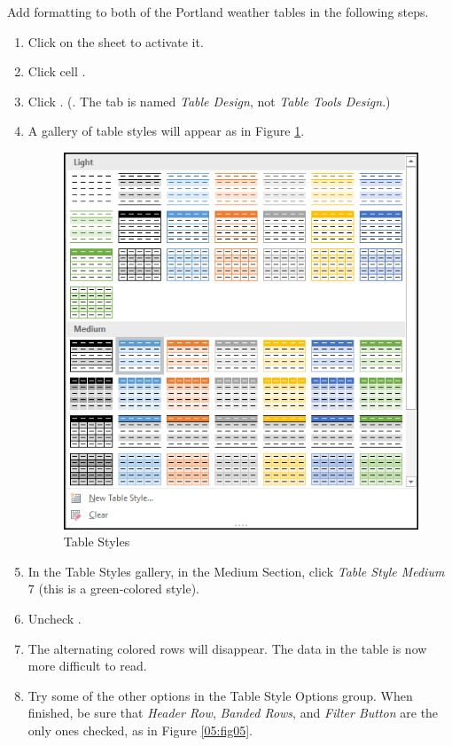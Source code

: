 Add formatting to both of the Portland weather tables in the following steps.

\begin{enumbox}
	\begin{enumerate}
		\item Click on the  sheet to activate it.
		\item Click cell .
		\item Click . (. The tab is named \textit{Table Design}, not \textit{Table Tools Design}.)
		\item A gallery of table styles will appear as in Figure \ref{05:fig04}.

		\begin{figure}[H]
			\centering
			\includegraphics[width=\maxwidth{.75\linewidth}]{gfx/ch05_fig04}
			\caption{Table Styles}
			\label{05:fig04}
		\end{figure}

		\item In the Table Styles gallery, in the Medium Section, click \textit{Table Style Medium} $ 7 $ (this is a green-colored style).
		\item Uncheck .
		\item The alternating colored rows will disappear. The data in the table is now more difficult to read.
		\item Try some of the other options in the Table Style Options group. When finished, be sure that \textit{Header Row}, \textit{Banded Rows}, and \textit{Filter Button} are the only ones checked, as in Figure \ref{05:fig05}.


\end{enumerate}
\end{enumbox}
